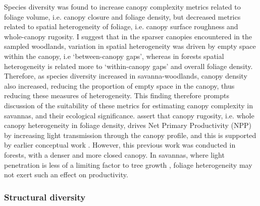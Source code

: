 \begin{refsection}
Species diversity was found to increase canopy complexity metrics related to foliage volume, i.e. canopy closure and foliage density, but decreased metrics related to spatial heterogeneity of foliage, i.e. canopy surface roughness and whole-canopy rugosity. I suggest that in the sparser canopies encountered in the sampled woodlands, variation in spatial heterogeneity was driven by empty space within the canopy, i.e `between-canopy gaps', whereas in forests spatial heterogeneity is related more to `within-canopy gaps' and overall foliage density. Therefore, as species diversity increased in savanna-woodlands, canopy density also increased, reducing the proportion of empty space in the canopy, thus reducing these measures of heterogeneity. This finding therefore prompts discussion of the suitability of these metrics for estimating canopy complexity in savannas, and their ecological significance. \citet{Hardiman2011} assert that canopy rugosity, i.e. whole canopy heterogeneity in foliage density, drives Net Primary Productivity (NPP) by increasing light transmission through the canopy profile, and this is supported by earlier conceptual work \citep{Horn1971}. However, this previous work was conducted in forests, with a denser and more closed canopy. In savannas, where light penetration is less of a limiting factor to tree growth \citep{Frost1996}, foliage heterogeneity may not exert such an effect on productivity. 

\subsubsection{Structural diversity}
\label{discussion:sssec:struc}


\end{refsection}
